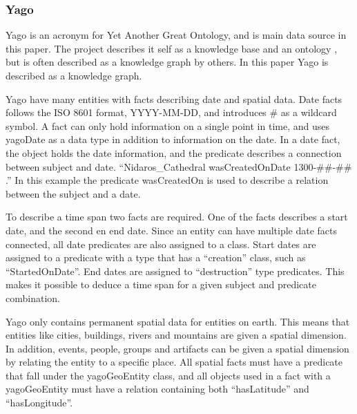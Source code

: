 \subsubsection{Yago}
Yago is an acronym for Yet Another Great Ontology, and is main data source in this paper. The project describes it self as a knowledge base\citep{yago} and an ontology \citep{mahdisoltani:hal-01699874}, but is often described as a knowledge graph by others. In this paper Yago is described as a knowledge graph.

Yago have many entities with facts describing date and spatial data.\citep{yago} Date facts follows the ISO 8601 format, YYYY-MM-DD, and introduces \# as a wildcard symbol. A fact can only hold information on a single point in time, and uses yagoDate as a data type in addition to information on the date.\citep{yago} In a date fact, the object holds the date information, and the predicate describes a connection between subject and date. ``Nidaros\_Cathedral wasCreatedOnDate 1300-\#\#-\#\# .'' In this example the predicate wasCreatedOn is used to describe a relation between the subject and a date.

To describe a time span two facts are required. One of the facts describes a start date, and the second en end date. Since an entity can have multiple date facts connected, all date predicates are also assigned to a class. Start dates are assigned to a predicate with a type that has a ``creation'' class, such as ``StartedOnDate''. End dates are assigned to ``destruction'' type predicates. This makes it possible to deduce a time span for a given subject and predicate combination.\citep{yago}

Yago only contains permanent spatial data for entities on earth. This means that entities like cities, buildings, rivers and mountains are given a spatial dimension. In addition, events, people, groups and artifacts can be given a spatial dimension by relating the entity to a specific place. All spatial facts must have a predicate that fall under the yagoGeoEntity class, and all objects used in a fact with a yagoGeoEntity must have a relation containing both ``hasLatitude'' and ``hasLongitude''.

